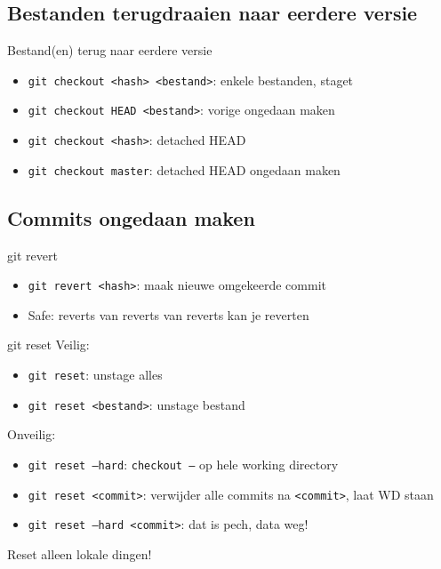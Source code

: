 \subsection{Bestanden terugdraaien naar eerdere versie}
\begin{frame}{Bestand(en) terug naar eerdere versie}
	\begin{itemize}
		\item \texttt{git checkout <hash> <bestand>}: enkele bestanden, staget
		\item \texttt{git checkout HEAD <bestand>}: vorige ongedaan maken
		\item \texttt{git checkout <hash>}: detached HEAD
		\item \texttt{git checkout master}: detached HEAD ongedaan maken
	\end{itemize}
\end{frame}

\subsection{Commits ongedaan maken}
\begin{frame}{git revert}
	\begin{itemize}
		\item \texttt{git revert <hash>}: maak nieuwe omgekeerde commit
		\item Safe: reverts van reverts van reverts kan je reverten
	\end{itemize}
\end{frame}

\begin{frame}{git reset}
	Veilig:
	\begin{itemize}
		\item \texttt{git reset}: unstage alles
		\item \texttt{git reset <bestand>}: unstage bestand
	\end{itemize}
	\alert{Onveilig:}
	\begin{itemize}
		\item \texttt{git reset --hard}: \texttt{checkout --} op hele working directory
		\item \texttt{git reset <commit>}: verwijder alle commits na \texttt{<commit>}, laat WD staan
		\item \texttt{git reset --hard <commit>}: \alert{dat is pech, data weg!}
	\end{itemize}
	\alert{Reset alleen lokale dingen!}
\end{frame}

